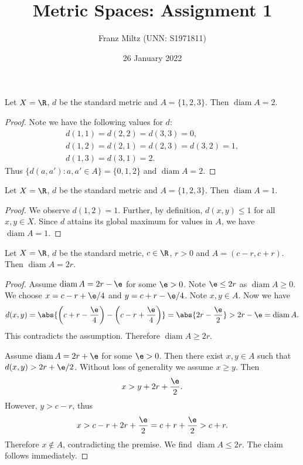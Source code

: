 \documentclass{article}
\DeclareMathOperator{\diam}{diam}
\begin{document}
\title{Metric Spaces: Assignment 1}
\author{Franz Miltz (UNN: S1971811)}
\date{26 January 2022}
\maketitle

\begin{claim*}[1a]
   Let $X=\R$, $d$ be the standard metric and $A=\{1,2,3\}$. Then $\diam A = 2$.
   \begin{proof}
      Note we have the following values for $d$:
      \begin{align*}
         d(1,1) = d(2,2) = d(3,3) = 0,\\
         d(1,2) = d(2,1) = d(2,3) = d(3,2) = 1,\\
         d(1,3) = d(3,1) = 2.
      \end{align*} 
      Thus $\{d(a,a'):a,a'\in A\}=\{0,1,2\}$ and $\diam A = 2$.
   \end{proof}
\end{claim*}

\begin{claim*}[1b]
   Let $X=\R$, $d$ be the standard metric and $A=\{1,2,3\}$. Then $\diam A=1$. 
   \begin{proof}
      We observe $d(1,2)=1$. Further, by definition, $d(x,y)\leq 1$ for all $x,y\in X$. 
      Since $d$ attains its global maximum for values in $A$, we have $\diam A=1$.
   \end{proof}
\end{claim*}

\begin{claim*}[2]
   Let $X=\R$, $d$ be the standard metric, $c\in\R$, $r>0$ and $A=(c-r,c+r)$. Then 
   $\diam A = 2r$.
   \begin{proof}
      Assume $\diam A = 2r-\e$ for some $\e>0$. Note $\e\leq 2r$ as $\diam A \geq 0$. 
      We choose $x=c-r+\e/4$ and $y=c+r-\e/4$. Note $x,y\in A$. Now we have 
      \begin{align*}
         d(x,y) = \abs{\left(c+r-\frac{\e}{4}\right)-\left(c-r+\frac{\e}{4}\right)}
         = \abs{2r-\frac{\e}{2}} > 2r - \e = \diam A.
      \end{align*}
      This contradicts the assumption. Therefore $\diam A \geq 2r$.

      Assume $\diam A = 2r+\e$ for some $\e>0$. Then there exist $x,y\in A$ such that 
      $d(x,y) > 2r+\e/2$. Without loss of generality we assume $x\geq y$. Then 
      \begin{align*}
          x > y + 2r + \frac{\e}{2}.
      \end{align*}
      However, $y > c - r$, thus 
      \begin{align*}
         x > c - r + 2r + \frac{\e}{2} = c + r + \frac{\e}{2} > c + r.
      \end{align*}
      Therefore $x\not\in A$, contradicting the premise. We find $\diam A \leq 2r$. 
      The claim follows immediately.
   \end{proof}
\end{claim*}
\end{document}
